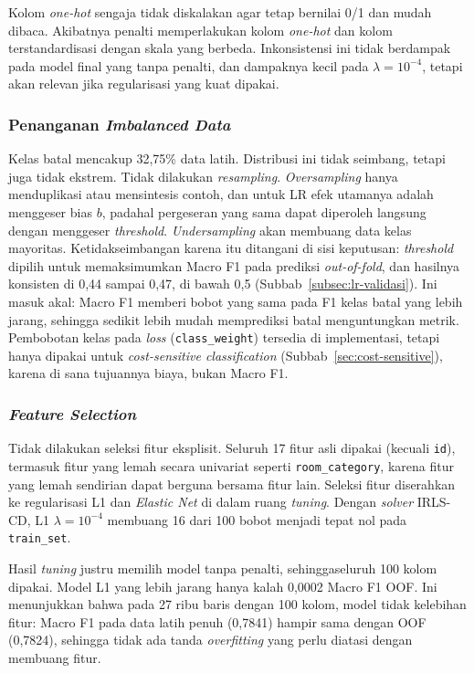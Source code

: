 Kolom \textit{one-hot} sengaja tidak diskalakan agar tetap bernilai 0/1 dan mudah dibaca. Akibatnya penalti memperlakukan kolom \textit{one-hot} dan kolom terstandardisasi dengan skala yang berbeda. Inkonsistensi ini tidak berdampak pada model final yang tanpa penalti, dan dampaknya kecil pada $\lambda = 10^{-4}$, tetapi akan relevan jika regularisasi yang kuat dipakai.

\subsubsection{Penanganan \textit{Imbalanced Data}}
Kelas batal mencakup 32,75\% data latih. Distribusi ini tidak seimbang, tetapi juga tidak ekstrem. Tidak dilakukan \textit{resampling}. \textit{Oversampling} hanya menduplikasi atau mensintesis contoh, dan untuk LR efek utamanya adalah menggeser bias $b$, padahal pergeseran yang sama dapat diperoleh langsung dengan menggeser \textit{threshold}. \textit{Undersampling} akan membuang data kelas mayoritas. Ketidakseimbangan karena itu ditangani di sisi keputusan: \textit{threshold} dipilih untuk memaksimumkan Macro F1 pada prediksi \textit{out-of-fold}, dan hasilnya konsisten di 0,44 sampai 0,47, di bawah 0,5 (Subbab~\ref{subsec:lr-validasi}). Ini masuk akal: Macro F1 memberi bobot yang sama pada F1 kelas batal yang lebih jarang, sehingga sedikit lebih mudah memprediksi batal menguntungkan metrik. Pembobotan kelas pada \textit{loss} (\texttt{class\_weight}) tersedia di implementasi, tetapi hanya dipakai untuk \textit{cost-sensitive classification} (Subbab~\ref{sec:cost-sensitive}), karena di sana tujuannya biaya, bukan Macro F1.

\subsubsection{\textit{Feature Selection}}
Tidak dilakukan seleksi fitur eksplisit. Seluruh 17 fitur asli dipakai (kecuali \texttt{id}), termasuk fitur yang lemah secara univariat seperti \texttt{room\_category}, karena fitur yang lemah sendirian dapat berguna bersama fitur lain. Seleksi fitur diserahkan ke regularisasi L1 dan \textit{Elastic Net} di dalam ruang \textit{tuning}. Dengan \textit{solver} IRLS-CD, L1 $\lambda = 10^{-4}$ membuang 16 dari 100 bobot menjadi tepat nol pada \texttt{train\_set}.

Hasil \textit{tuning} justru memilih model tanpa penalti, sehinggaseluruh 100 kolom dipakai. Model L1 yang lebih jarang hanya kalah 0,0002 Macro F1 OOF. Ini menunjukkan bahwa pada 27 ribu baris dengan 100 kolom, model tidak kelebihan fitur: Macro F1 pada data latih penuh (0,7841) hampir sama dengan OOF (0,7824), sehingga tidak ada tanda \textit{overfitting} yang perlu diatasi dengan membuang fitur.


